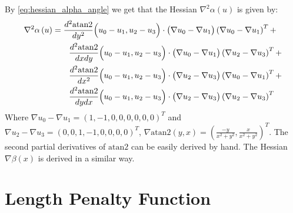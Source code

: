 By \ref{eq:hessian_alpha_angle} we get that the Hessian $\nabla^2 \alpha\left(u\right)$ is given by:
\begin{equation}
\begin{split}
\nabla^2 \alpha\left(u\right) &= 
\frac{d^2\mathrm{atan2}}{dy^2}\Big(u_0 - u_1, u_2 - u_3\Big) \cdot \big(\nabla u_0 - \nabla u_1\big) \left(\nabla u_0 - \nabla u_1\right)^T + \\
\notag
&\quad \quad \frac{d^2\mathrm{atan2}}{dxdy}\Big(u_0 - u_1, u_2 - u_3\Big) \cdot \big(\nabla u_0 - \nabla u_1\big) \left(\nabla u_2 - \nabla u_3\right)^T + \\
\notag
&\quad \quad \frac{d^2\mathrm{atan2}}{dx^2}\Big(u_0 - u_1, u_2 - u_3\Big) \cdot \big(\nabla u_2 - \nabla u_3\big) \left(\nabla u_0 - \nabla u_1\right)^T + \\
\notag
&\quad \quad \frac{d^2\mathrm{atan2}}{dydx}\Big(u_0 - u_1, u_2 - u_3\Big) \cdot \big(\nabla u_2 - \nabla u_3\big) \left(\nabla u_2 - \nabla u_3\right)^T
\end{split}
\end{equation}
Where $\nabla u_0 - \nabla u_1 = \left(1,-1,0,0,0,0,0,0\right)^T$ and $\nabla u_2 - \nabla u_3 = \left(0,0,1,-1,0,0,0,0\right)^T$, $\nabla \mathrm{atan2}\left(y,x\right) = \left(\frac{-y}{x^2+y^2}, \frac{x}{x^2 + y^2}\right)^T$. The second partial derivatives of $\mathrm{atan2}$ can be easily derived by hand.
The Hessian $\nabla\beta\left(x\right)$ is derived in a similar way.
\section{Length Penalty Function}